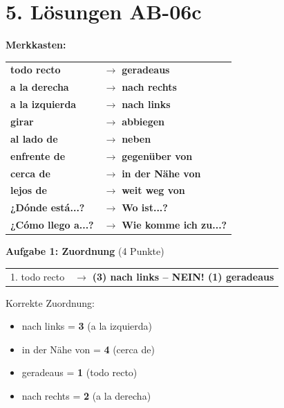\documentclass[11pt, a4paper]{article}
\newcommand{\fachfarbe}{spanisch}
\newcommand{\sequenz}{06}
\newcommand{\block}{c}
\newcommand{\loesung}[1]{\textcolor{loesung}{\textbf{#1}}}
\newcommand{\es}[1]{\textcolor{\fachfarbe}{\textbf{#1}}}
\begin{document}

\section*{5. Lösungen AB-\sequenz\block}

\textbf{Merkkasten:}

\begin{tabular}{ll}
\es{todo recto} & $\rightarrow$ \loesung{geradeaus} \\
\es{a la derecha} & $\rightarrow$ \loesung{nach rechts} \\
\es{a la izquierda} & $\rightarrow$ \loesung{nach links} \\
\es{girar} & $\rightarrow$ \loesung{abbiegen} \\
\es{al lado de} & $\rightarrow$ \loesung{neben} \\
\es{enfrente de} & $\rightarrow$ \loesung{gegenüber von} \\
\es{cerca de} & $\rightarrow$ \loesung{in der Nähe von} \\
\es{lejos de} & $\rightarrow$ \loesung{weit weg von} \\
\es{¿Dónde está...?} & $\rightarrow$ \loesung{Wo ist...?} \\
\es{¿Cómo llego a...?} & $\rightarrow$ \loesung{Wie komme ich zu...?} \\
\end{tabular}

\vspace{1em}

\textbf{Aufgabe 1: Zuordnung} (4 Punkte)

\begin{tabular}{ll}
1. todo recto & $\rightarrow$ \loesung{(3) nach links -- NEIN! (1) geradeaus} \\
\end{tabular}

Korrekte Zuordnung:
\begin{itemize}
    \item nach links = \loesung{3} (a la izquierda)
    \item in der Nähe von = \loesung{4} (cerca de)
    \item geradeaus = \loesung{1} (todo recto)
    \item nach rechts = \loesung{2} (a la derecha)
\end{itemize}
\end{document}
